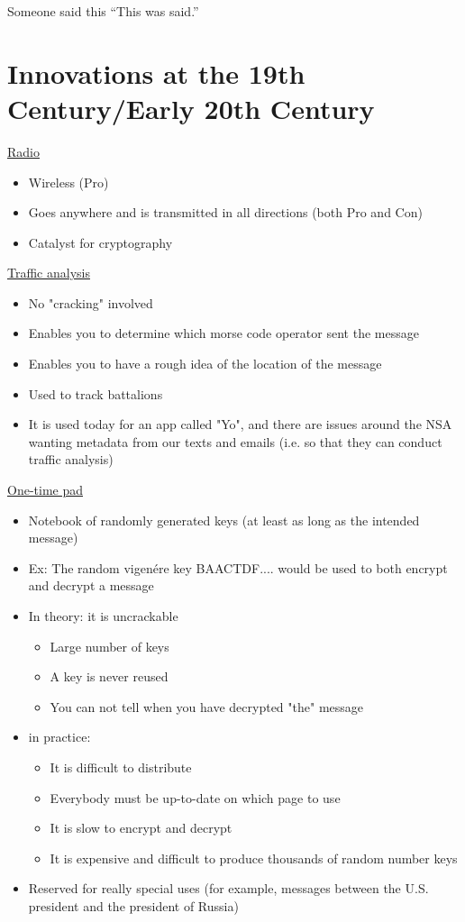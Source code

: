 \begin{chapquote}{Someone said this}
``This was said.''
\end{chapquote}

\section{Innovations at the 19th Century/Early 20th Century}
\underline{Radio} \begin{itemize} \item Wireless (Pro) \item Goes anywhere and is transmitted in all directions (both Pro and Con) \item Catalyst for cryptography \end{itemize}
\underline{Traffic analysis} \begin{itemize} \item No "cracking" involved \item Enables you to determine which morse code operator sent the message \item Enables you to have a rough idea of the location of the message \item Used to track battalions \item It is used today for an app called "Yo", and there are issues around the NSA wanting metadata from our texts and emails (i.e. so that they can conduct traffic analysis) \end{itemize}
\underline{One-time pad} \begin{itemize} \item Notebook of randomly generated keys (at least as long as the intended message) \item Ex: The random vigen\'ere key BAACTDF.... would be used to both encrypt and decrypt a message \item In theory: it is uncrackable \begin{itemize} \item Large number of keys \item A key is never reused \item You can not tell when you have decrypted "the" message \end{itemize} \item in practice: \begin{itemize} \item It is difficult to distribute \item Everybody must be up-to-date on which page to use \item It is slow to encrypt and decrypt \item It is expensive and difficult to produce thousands of random number keys \end{itemize} \item Reserved for really special uses (for example, messages between the U.S. president and the president of Russia) \end{itemize}

